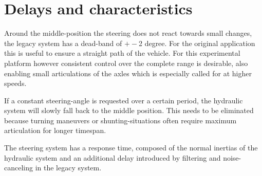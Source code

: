 \documentclass[root.tex]{subfiles}
\begin{document}
	
	{\pagestyle{empty}}
	\section{Delays and characteristics}
	\label{chap:Delays}
	
	Around the middle-position the steering does not react towards small changes, the legacy system has a dead-band of $+-$2 degree. For the original application this is useful to ensure a straight path of the vehicle. For this experimental platform however consistent control over the complete range is desirable, also enabling small articulations of the axles which is especially called for at higher speeds. 
	
	If a constant steering-angle is requested over a certain period, the hydraulic system will slowly fall back to the middle position. This needs to be eliminated because turning maneuvers or shunting-situations often require maximum articulation for longer timespan.
	
	The steering system has a response time, composed of the normal inertias of the hydraulic system and an additional delay introduced by filtering and noise-canceling in the legacy system. 
	
\end{document}
